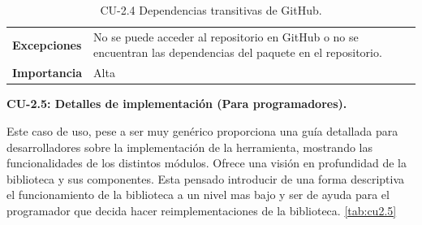 \begin{table}[p]
\begin{tabularx}{\linewidth}{ p{} p{} }
		\textbf{Excepciones}          & No se puede acceder al repositorio en GitHub o no se encuentran las dependencias del paquete en el repositorio.                                                            \\
		\textbf{Importancia}          & Alta                                                                                                                                                                       \\
		\bottomrule
	\end{tabularx}
	\caption{CU-2.4 Dependencias transitivas de GitHub.}
	\label{tab:cu2.4}
\end{table}


\textbf{CU-2.5: Detalles de implementación (Para programadores).}

Este caso de uso, pese a ser muy genérico proporciona una guía detallada para desarrolladores sobre la implementación
de la herramienta, mostrando las funcionalidades de los distintos módulos. Ofrece una visión en
profundidad de la biblioteca y sus componentes. Esta pensado introducir de una forma descriptiva el funcionamiento de la biblioteca
a un nivel mas bajo y ser de ayuda para el programador que decida hacer reimplementaciones de la biblioteca. \ref{tab:cu2.5}

